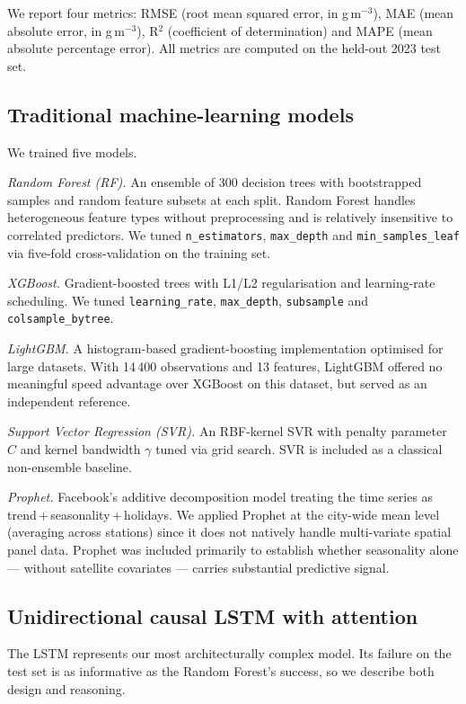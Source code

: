 \documentclass{iopjournal}
\begin{document}
We report four metrics: RMSE (root mean squared error, in
\textmu g\,m$^{-3}$), MAE (mean absolute error, in
\textmu g\,m$^{-3}$), R$^{2}$ (coefficient of determination) and
MAPE (mean absolute percentage error). All metrics are computed on
the held-out 2023 test set.

\subsection{Traditional machine-learning models}

We trained five models.

\textit{Random Forest (RF).} An ensemble of 300 decision trees with
bootstrapped samples and random feature subsets at each split.
Random Forest handles heterogeneous feature types without
preprocessing and is relatively insensitive to correlated predictors.
We tuned \texttt{n\_estimators}, \texttt{max\_depth} and
\texttt{min\_samples\_leaf} via five-fold cross-validation on the
training set.

\textit{XGBoost.} Gradient-boosted trees with L1/L2 regularisation
and learning-rate scheduling. We tuned \texttt{learning\_rate},
\texttt{max\_depth}, \texttt{subsample} and
\texttt{colsample\_bytree}.

\textit{LightGBM.} A histogram-based gradient-boosting implementation
optimised for large datasets. With 14\,400 observations and 13
features, LightGBM offered no meaningful speed advantage over
XGBoost on this dataset, but served as an independent reference.

\textit{Support Vector Regression (SVR).} An RBF-kernel SVR with
penalty parameter $C$ and kernel bandwidth $\gamma$ tuned via grid
search. SVR is included as a classical non-ensemble baseline.

\textit{Prophet.} Facebook's additive decomposition model treating
the time series as trend\,+\,seasonality\,+\,holidays. We applied
Prophet at the city-wide mean level (averaging across stations)
since it does not natively handle multi-variate spatial panel data.
Prophet was included primarily to establish whether seasonality
alone --- without satellite covariates --- carries substantial
predictive signal.

\subsection{Unidirectional causal LSTM with attention}

The LSTM represents our most architecturally complex model.
Its failure on the test set is as informative as the Random Forest's
success, so we describe both design and reasoning.
\end{document}
